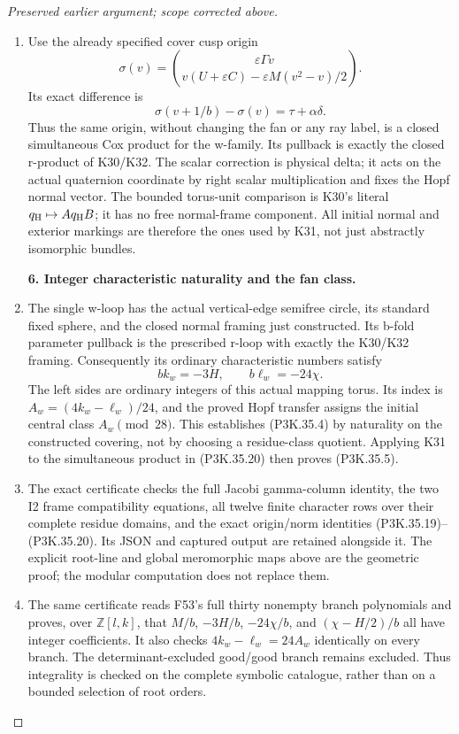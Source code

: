 \begin{proof}[Preserved earlier argument; scope corrected above]
\begin{enumerate}[label=\arabic*.]
\item Use the already specified cover cusp origin
\[
 \sigma(v)=\binom{\varepsilon\Gamma v}
                {v(U+\varepsilon C)-\varepsilon M(v^2-v)/2}.
\]
Its exact difference is
\[
               \sigma(v+1/b)-\sigma(v)=\tau+\alpha\delta.
                                                               \tag{P3K.35.20}
\]
Thus the same origin, without changing the fan or any ray label,
is a closed simultaneous Cox product for the w-family. Its
pullback is exactly the closed r-product of K30/K32. The scalar
correction is physical delta; it acts on the actual quaternion
coordinate by right scalar multiplication and fixes the Hopf
normal vector. The bounded torus-unit comparison is K30's
literal \(q_{\rm H}\mapsto A q_{\rm H}B\); it has no free
normal-frame component. All initial normal and exterior markings
are therefore the ones used by K31, not just abstractly
isomorphic bundles.

\par\medskip\noindent\textbf{6. Integer characteristic naturality and the fan class.}\enspace

\item The single w-loop has the actual vertical-edge semifree circle,
its standard fixed sphere, and the closed normal framing just
constructed. Its b-fold parameter pullback is the prescribed
r-loop with exactly the K30/K32 framing. Consequently its
ordinary characteristic numbers satisfy
\[
 b k_w=-3H,\qquad b\ell_w=-24\chi.
\]
The left sides are ordinary integers of this actual mapping
torus. Its index is \(A_w=(4k_w-\ell_w)/24\), and the proved
Hopf transfer assigns the initial central class
\(A_w\pmod{28}\). This establishes (P3K.35.4) by naturality on
the constructed covering, not by choosing a residue-class
quotient. Applying K31 to the simultaneous product in (P3K.35.20)
then proves (P3K.35.5).

\item The exact certificate 
checks the full Jacobi gamma-column identity, the two I2 frame
compatibility equations, all twelve finite character rows over
their complete residue domains, and the exact origin/norm
identities (P3K.35.19)--(P3K.35.20). Its JSON and captured output are
retained alongside it. The explicit root-line and global
meromorphic maps above are the geometric proof; the modular
computation does not replace them.

\item The same certificate reads F53's full thirty nonempty branch
polynomials and proves, over \(\mathbb Z[l,k]\), that
\(M/b\), \(-3H/b\), \(-24\chi/b\), and
\((\chi-H/2)/b\) all have integer coefficients. It also checks
\(4k_w-\ell_w=24A_w\) identically on every branch. The
determinant-excluded good/good branch remains excluded. Thus
integrality is checked on the complete symbolic catalogue,
rather than on a bounded selection of root orders.


\end{enumerate}
\end{proof}
